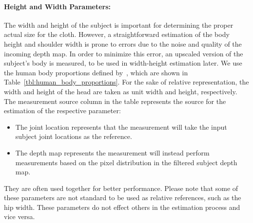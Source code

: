 \documentclass[number,preprint,review,12pt]{elsarticle}
\begin{document}
\doublespacing

\paragraph{Height and Width Parameters:}

The width and height of the subject is important for determining the proper actual size for the cloth. However, a straightforward 
estimation of the body height and shoulder width is prone to errors due to the noise and quality of the incoming depth map. In 
order to minimize this error, an upscaled version of the subject's body is measured, to be used in width-height estimation 
later. We use the human body proportions defined by~\cite{Willis2012}, which are shown in Table~\ref{tbl:human_body_proportions}. 
For the sake of relative representation, the width and height of the head are taken as unit width and height, respectively. The 
measurement source column in the table represents the source for the estimation of the respective parameter:
\begin{itemize} 
\item
The joint location represents that the measurement will take the input subject joint locations as the reference.
\item 
The depth map represents the measurement will instead perform measurements based on the pixel distribution in the filtered subject depth map. 
\end{itemize}
They are often used together for better performance. Please note that some of these parameters are not standard to be used as relative references, such as the hip width. These parameters do not effect others in the estimation process and vice versa.
\end{document}
